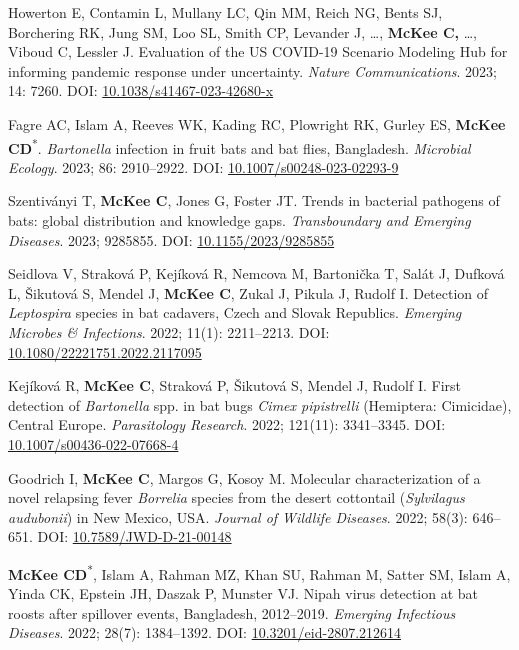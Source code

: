 \documentclass{cv}
\begin{document}
\begin{pubenum}
\item Howerton E, Contamin L, Mullany LC, Qin MM, Reich NG, Bents SJ, Borchering RK, Jung SM, Loo SL, Smith CP, Levander J, …, \textbf{McKee C,} …, Viboud C, Lessler J. Evaluation of the US COVID-19 Scenario Modeling Hub for informing pandemic response under uncertainty. \textit{Nature Communications}. 2023; 14: 7260. DOI: \href{https://doi.org/10.1038/s41467-023-42680-x}{10.1038/s41467-023-42680-x}

\item Fagre AC, Islam A, Reeves WK, Kading RC, Plowright RK, Gurley ES, \textbf{McKee CD}\textsuperscript{*}. \textit{Bartonella} infection in fruit bats and bat flies, Bangladesh. \textit{Microbial Ecology}. 2023; 86: 2910--2922. DOI: \href{https://doi.org/10.1007/s00248-023-02293-9}{10.1007/s00248-023-02293-9}

\item Szentiványi T, \textbf{McKee C}, Jones G, Foster JT. Trends in bacterial pathogens of bats: global distribution and knowledge gaps. \textit{Transboundary and Emerging Diseases}. 2023; 9285855. DOI: \href{https://doi.org/10.1155/2023/9285855}{10.1155/2023/9285855}

\item Seidlova V, Straková P, Kejíková R, Nemcova M, Bartonička T, Salát J, Dufková L, Šikutová S, Mendel J, \textbf{McKee C}, Zukal J, Pikula J, Rudolf I. Detection of \textit{Leptospira} species in bat cadavers, Czech and Slovak Republics. \textit{Emerging Microbes \& Infections}. 2022; 11(1): 2211--2213. DOI: \href{https://doi.org/10.1080/22221751.2022.2117095}{10.1080/22221751.2022.2117095}

\item Kejíková R, \textbf{McKee C}, Straková P, Šikutová S, Mendel J, Rudolf I. First detection of \textit{Bartonella} spp. in bat bugs \textit{Cimex pipistrelli} (Hemiptera: Cimicidae), Central Europe. \textit{Parasitology Research}. 2022; 121(11): 3341--3345. DOI: \href{https://doi.org/10.1007/s00436-022-07668-4}{10.1007/s00436-022-07668-4}

\item Goodrich I, \textbf{McKee C}, Margos G, Kosoy M. Molecular characterization of a novel relapsing fever \textit{Borrelia} species from the desert cottontail (\textit{Sylvilagus audubonii}) in New Mexico, USA. \textit{Journal of Wildlife Diseases}. 2022; 58(3): 646--651. DOI: \href{https://doi.org/10.7589/JWD-D-21-00148}{10.7589/JWD-D-21-00148}

\item \textbf{McKee CD}\textsuperscript{*\dag}, Islam A\textsuperscript{\dag}, Rahman MZ, Khan SU, Rahman M, Satter SM, Islam A, Yinda CK, Epstein JH, Daszak P, Munster VJ. Nipah virus detection at bat roosts after spillover events, Bangladesh, 2012--2019. \textit{Emerging Infectious Diseases}. 2022; 28(7): 1384--1392. DOI: \href{https://doi.org/10.3201/eid2807.212614}{10.3201/eid-2807.212614}


\end{pubenum}
\end{document}
